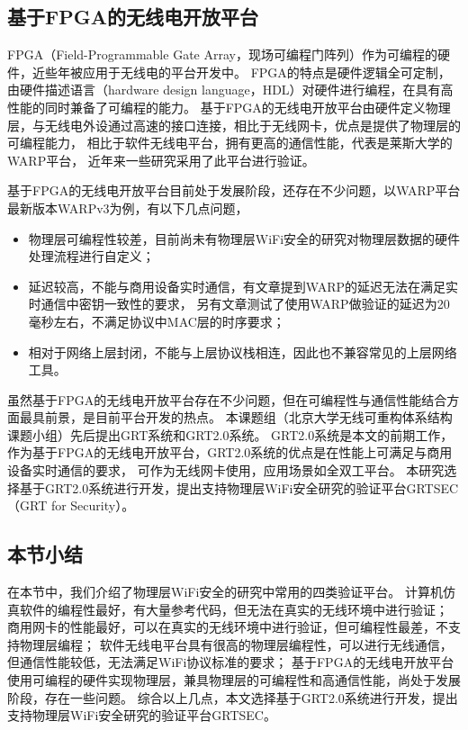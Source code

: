 		\subsection{基于FPGA的无线电开放平台}
		FPGA（Field-Programmable Gate Array，现场可编程门阵列）作为可编程的硬件，近些年被应用于无线电的平台开发中。
		FPGA的特点是硬件逻辑全可定制，由硬件描述语言（hardware design language，HDL）对硬件进行编程，在具有高性能的同时兼备了可编程的能力。
		基于FPGA的无线电开放平台由硬件定义物理层，与无线电外设通过高速的接口连接，相比于无线网卡，优点是提供了物理层的可编程能力，
		相比于软件无线电平台，拥有更高的通信性能，代表是莱斯大学的WARP平台\cite{warp}，
		近年来一些研究采用了此平台进行验证\cite{mobicom13securearray, access16key}。

		基于FPGA的无线电开放平台目前处于发展阶段，还存在不少问题，以WARP平台最新版本WARPv3为例，有以下几点问题，
		\begin{itemize}
			\item 物理层可编程性较差，目前尚未有物理层WiFi安全的研究对物理层数据的硬件处理流程进行自定义；
			\item 延迟较高，不能与商用设备实时通信，有文章提到WARP的延迟无法在满足实时通信中密钥一致性的要求\cite{access16key}，
			另有文章测试了使用WARP做验证的延迟为20毫秒左右，不满足协议中MAC层的时序要求\cite{mobicom13securearray}；
			\item 相对于网络上层封闭，不能与上层协议栈相连，因此也不兼容常见的上层网络工具。
		\end{itemize}

		虽然基于FPGA的无线电开放平台存在不少问题，但在可编程性与通信性能结合方面最具前景，是目前平台开发的热点。
		本课题组（北京大学无线可重构体系结构课题小组\cite{pkuraw}）先后提出GRT系统\cite{can14grt}和GRT2.0系统\cite{sigda17grt}。
		GRT2.0系统是本文的前期工作，作为基于FPGA的无线电开放平台，GRT2.0系统的优点是在性能上可满足与商用设备实时通信的要求，
		可作为无线网卡使用，应用场景如全双工平台\cite{mna16grt}。
		本研究选择基于GRT2.0系统进行开发，提出支持物理层WiFi安全研究的验证平台GRTSEC（GRT for Security）。

		\subsection{本节小结}
		在本节中，我们介绍了物理层WiFi安全的研究中常用的四类验证平台。
		计算机仿真软件的编程性最好，有大量参考代码，但无法在真实的无线环境中进行验证；
		商用网卡的性能最好，可以在真实的无线环境中进行验证，但可编程性最差，不支持物理层编程；
		软件无线电平台具有很高的物理层编程性，可以进行无线通信，但通信性能较低，无法满足WiFi协议标准的要求；
		基于FPGA的无线电开放平台使用可编程的硬件实现物理层，兼具物理层的可编程性和高通信性能，尚处于发展阶段，存在一些问题。
		综合以上几点，本文选择基于GRT2.0系统进行开发，提出支持物理层WiFi安全研究的验证平台GRTSEC。

